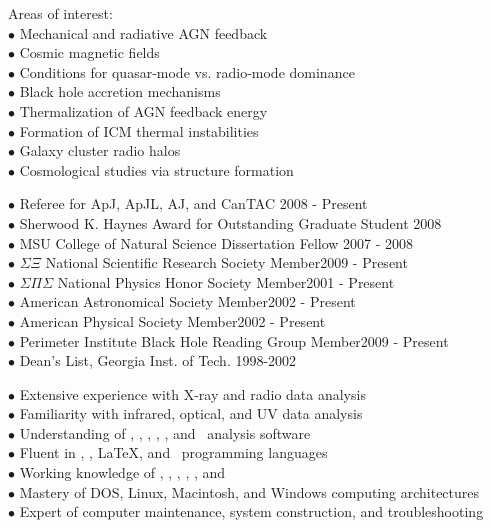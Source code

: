 \documentclass[11pt]{cv}
\begin{document}
\begin{llist}
Areas of interest:\\
$\bullet$ Mechanical and radiative AGN feedback\\
$\bullet$ Cosmic magnetic fields\\
$\bullet$ Conditions for quasar-mode vs. radio-mode dominance\\
$\bullet$ Black hole accretion mechanisms\\
$\bullet$ Thermalization of AGN feedback energy\\
$\bullet$ Formation of ICM thermal instabilities\\
$\bullet$ Galaxy cluster radio halos\\
$\bullet$ Cosmological studies via structure formation


$\bullet$ Referee for ApJ, ApJL, AJ, and CanTAC \hfill 2008 - Present\\
$\bullet$ Sherwood K. Haynes Award for Outstanding Graduate Student \hfill 2008\\
$\bullet$ MSU College of Natural Science Dissertation Fellow \hfill 2007 - 2008\\
$\bullet$ $\Sigma \Xi$ National Scientific Research Society Member\hfill 2009 - Present\\
$\bullet$ $\Sigma \Pi \Sigma$ National Physics Honor Society Member\hfill 2001 - Present\\
$\bullet$ American Astronomical Society Member\hfill 2002 - Present\\
$\bullet$ American Physical Society Member\hfill 2002 - Present\\
$\bullet$ Perimeter Institute Black Hole Reading Group Member\hfill 2009 - Present\\
$\bullet$ Dean's List, Georgia Inst. of Tech. \hfill 1998-2002


$\bullet$ Extensive experience with X-ray and radio data analysis\\
$\bullet$ Familiarity with infrared, optical, and UV data analysis\\
$\bullet$ Understanding of \aips, \casa, \ciao, \iraf, \osa, and \sas\ analysis software\\
$\bullet$ Fluent in \html, \idl, \LaTeX, and \perl\ programming languages\\
$\bullet$ Working knowledge of \clang, \fortran, \mysql, \python, \supmo, and \tcl\\
$\bullet$ Mastery of DOS, Linux, Macintosh, and Windows computing architectures\\
$\bullet$ Expert of computer maintenance, system construction, and troubleshooting


\end{llist}
\end{document}
